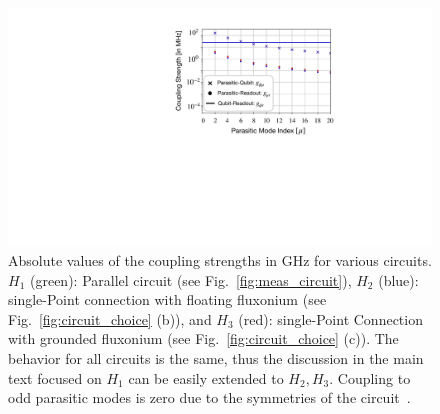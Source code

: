 \documentclass[%
reprint,
superscriptaddress,
 amsmath,amssymb,
 aps,
 prx,
longbibliography,
floatfix,
]{revtex4-2}
\begin{document}
\begin{figure}[htb]
    \centering
    \includegraphics[width=\linewidth]{Figures/Coupling_strength.pdf}
    \caption{Absolute values of the coupling strengths in GHz for various circuits. $H_1$ (green): Parallel circuit (see Fig.~\ref{fig:meas_circuit}), $H_2$ (blue): single-Point connection with floating fluxonium  (see Fig.~\ref{fig:circuit_choice} (b)), and $H_3$ (red): single-Point Connection with grounded fluxonium (see Fig.~\ref{fig:circuit_choice} (c)). The behavior for all circuits is the same, thus the discussion in the main text focused on $H_1$ can be easily extended to $H_2,H_3$. Coupling to odd parasitic modes is zero due to the symmetries of the circuit~\cite{viola2015collective}.}
    \label{fig:coupling-strength}
\end{figure}
\end{document}
